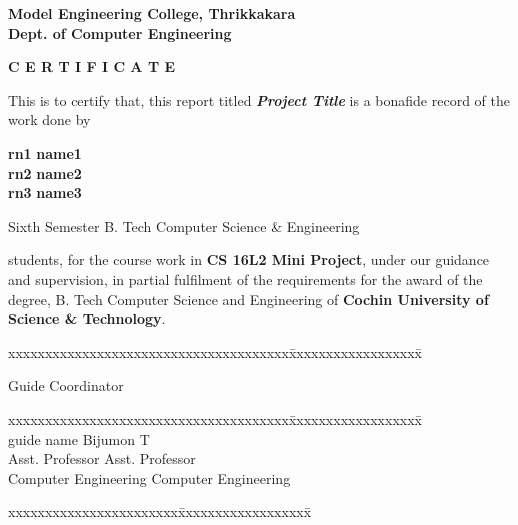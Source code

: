 \documentclass[11pt]{report}
\begin{document}

\begin{titlepage}
\begin{center}
\Large{\textbf{Model Engineering College, Thrikkakara}}\\
\Large{\textbf{Dept. of Computer Engineering}}\\
\end{center}
\begin{figure}[h]
\begin{center}
\end{center}
\end{figure}
\begin{center}
\Large{\textbf{C E R T I F I C A T E}}\\
\vspace{.1in}
\end{center}
This is to certify that, this report titled \textbf{\textit{Project Title}} is a bonafide record of the work done by\\
\begin{center}

\Large{\textbf{rn1}}  \Large{\textbf{name1}}\\ 
\Large{\textbf{rn2}}  \Large{\textbf{name2}}\\ 
\Large{\textbf{rn3}}  \Large{\textbf{name3}}\\

\end{center}
\centerline {\textsf{Sixth Semester B. Tech Computer Science \& Engineering}} students, for the course work in \textbf{CS 16L2 Mini Project},  under our guidance and supervision, in partial 
fulfilment of the requirements for the award of the degree, B. Tech Computer Science  and Engineering of \textbf{Cochin University of Science \& Technology}.
\vspace{.1in}
\begin{tabbing}
xxxxxxxxxxxxxxxxxxxxxxxxxxxxxxxxxxxxxx\= xxxxxxxxxxxxxxxxxx\= \kill

Guide			\>				\> Coordinator \\
\end{tabbing}
\begin{tabbing}
xxxxxxxxxxxxxxxxxxxxxxxxxxxxxxxxxxxxxx\= xxxxxxxxxxxxxxxxxx\= \kill
\vspace{.1in}\\		
guide name \> \> Bijumon T \\
Asst. Professor	\> \> Asst. Professor\\
Computer  Engineering	\>	\> Computer  Engineering\\
\end{tabbing}
\vspace{.1in}
%
\begin{tabbing}
xxxxxxxxxxxxxxxxxxxxxxx\= xxxxxxxxxxxxxxxxxx\= \kill


\end{tabbing}
\end{titlepage}
\end{document}
